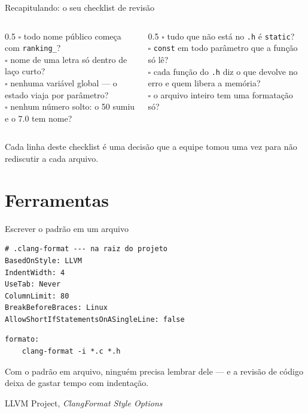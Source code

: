 \documentclass[aspectratio=169]{beamer}
\newcommand{\fonte}[1]{\vfill\hfill{\scriptsize\textcolor{UFSGray}{#1}}}
\begin{document}
\begin{frame}{Recapitulando: o seu checklist de revisão}
  \begin{columns}[T]
    \begin{column}{0.5\textwidth}
      \small
      $\square$ todo nome público começa com \texttt{ranking\_}?\\[0.35em]
      $\square$ nome de uma letra só dentro de laço curto?\\[0.35em]
      $\square$ nenhuma variável global --- o estado viaja por
        parâmetro?\\[0.35em]
      $\square$ nenhum número solto: o 50 sumiu e o 7.0 tem nome?
    \end{column}
    \begin{column}{0.5\textwidth}
      \small
      $\square$ tudo que não está no \texttt{.h} é \texttt{static}?\\[0.35em]
      $\square$ \texttt{const} em todo parâmetro que a função só lê?\\[0.35em]
      $\square$ cada função do \texttt{.h} diz o que devolve no erro e quem
        libera a memória?\\[0.35em]
      $\square$ o arquivo inteiro tem uma formatação só?
    \end{column}
  \end{columns}
  \begin{block}{}
    \small Cada linha deste checklist é uma decisão que a equipe tomou uma
    vez para não rediscutir a cada arquivo.
  \end{block}
\end{frame}

\section{Ferramentas}

\begin{frame}[fragile]{Escrever o padrão em um arquivo}
\begin{lstlisting}[style=shellStyle]
# .clang-format --- na raiz do projeto
BasedOnStyle: LLVM
IndentWidth: 4
UseTab: Never
ColumnLimit: 80
BreakBeforeBraces: Linux
AllowShortIfStatementsOnASingleLine: false
\end{lstlisting}
\begin{lstlisting}[style=makeStyle]
formato:
	clang-format -i *.c *.h
\end{lstlisting}
  \begin{block}{}
    \small Com o padrão em arquivo, ninguém precisa lembrar dele --- e a
    revisão de código deixa de gastar tempo com indentação.
  \end{block}
  \fonte{LLVM Project, \emph{ClangFormat Style Options}~\cite{llvm2024clangformat}}
\end{frame}
\end{document}
